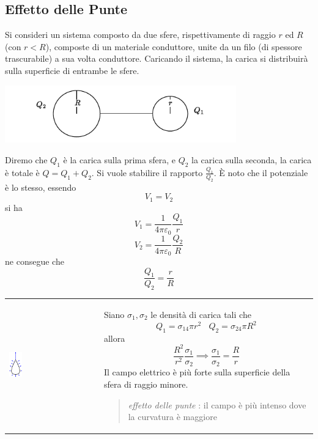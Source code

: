 \documentclass[10pt, letterpaper]{report}
\begin{document}
\subsection{Effetto delle Punte}
Si consideri un sistema composto da due sfere, rispettivamente di raggio $r$ ed $R$ (con $r<R$), composte di un materiale conduttore, unite da un filo (di spessore trascurabile) a sua volta conduttore. Caricando il sistema, la carica si distribuirà sulla superficie di entrambe le sfere.\begin{center}
    \includegraphics[width=0.75\textwidth]{images/punte.pdf}
\end{center} 
Diremo che $Q_1$ è la carica sulla prima sfera, e $Q_2$ la carica sulla seconda, la carica è totale è $Q=Q_1+Q_2$.
Si vuole stabilire il rapporto $\frac{Q_1}{Q_2}$. È noto che il potenziale è lo stesso, essendo 
$$ V_1=V_2$$
si ha 
$$ V_1=\frac{1}{4\pi\varepsilon_0}\frac{Q_1}{r}$$
$$ V_2=\frac{1}{4\pi\varepsilon_0}\frac{Q_2}{R}$$
ne consegue che 
$$ \frac{Q_1}{Q_2}=\frac{r}{R}$$
\begin{center}
	\begin{tabular}{>{\centering\arraybackslash}m{3in}>{\centering\arraybackslash}m{3in}}
        \includegraphics[width=0.15\textwidth]{images/effettoPunta.eps} &   
		Siano $\sigma_1,\sigma_2$ le densità di carica tali che 
$$ Q_1=\sigma_14\pi r^2 \ \ \ \ Q_2=\sigma_24\pi R^2$$
allora 
$$\frac{R^2}{r^2}\frac{\sigma_1}{\sigma_2}\implies \frac{\sigma_1}{\sigma_2}=\frac{R}{r} $$
Il campo elettrico è più forte sulla superficie della sfera di raggio minore.\begin{quote}
    \textit{effetto delle punte} : il campo è più intenso dove la curvatura è maggiore
\end{quote}
		\\
	\end{tabular}
\end{center}
\end{document}

